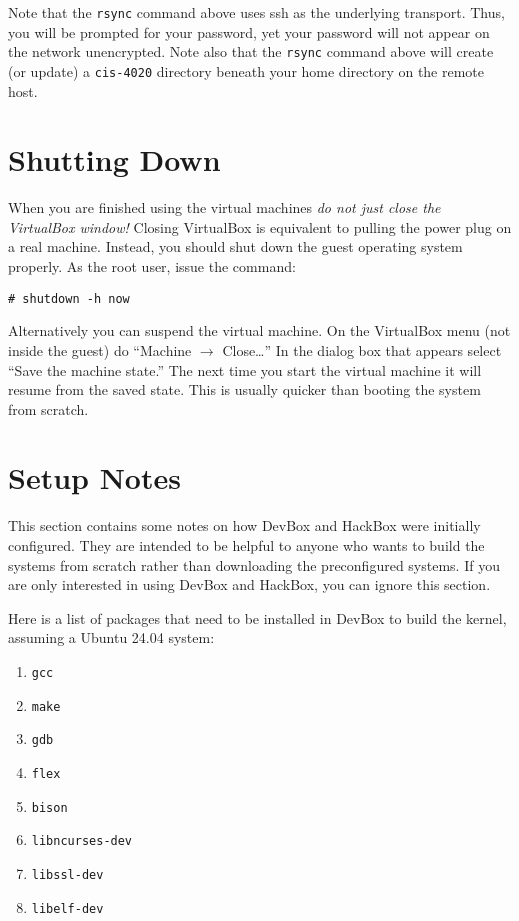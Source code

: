 \documentclass{article}
\newcommand{\command}[1]{\texttt{#1}}
\newcommand{\filename}[1]{\texttt{#1}}
\begin{document}
Note that the \command{rsync} command above uses ssh as the underlying transport. Thus, you will
be prompted for your password, yet your password will not appear on the network unencrypted.
Note also that the \command{rsync} command above will create (or update) a \filename{cis-4020}
directory beneath your home directory on the remote host.

\section{Shutting Down}

When you are finished using the virtual machines \emph{do not just close the VirtualBox window!}
Closing VirtualBox is equivalent to pulling the power plug on a real machine. Instead, you
should shut down the guest operating system properly. As the root user, issue the command:
\begin{Verbatim}
# shutdown -h now
\end{Verbatim}

Alternatively you can suspend the virtual machine. On the VirtualBox menu (not inside the guest)
do ``Machine $\rightarrow$ Close\ldots'' In the dialog box that appears select ``Save the
machine state.'' The next time you start the virtual machine it will resume from the saved
state. This is usually quicker than booting the system from scratch.

\section{Setup Notes}

This section contains some notes on how DevBox and HackBox were initially configured. They are
intended to be helpful to anyone who wants to build the systems from scratch rather than
downloading the preconfigured systems. If you are only interested in using DevBox and HackBox,
you can ignore this section.

Here is a list of packages that need to be installed in DevBox to build the kernel, assuming a
Ubuntu 24.04 system:
\begin{enumerate}
  \item \texttt{gcc}
  \item \texttt{make}
  \item \texttt{gdb}
  \item \texttt{flex}
  \item \texttt{bison}
  \item \texttt{libncurses-dev}
  \item \texttt{libssl-dev}
  \item \texttt{libelf-dev}
\end{enumerate}
\end{document}

